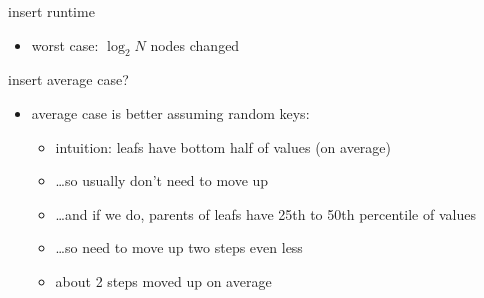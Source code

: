 \begin{frame}{insert runtime}
    \begin{itemize}
    \item worst case: $\log_2 N$ nodes changed
    \end{itemize}
\end{frame}

\begin{frame}{insert average case?}
    \begin{itemize}
    \item average case is better assuming random keys:
        \begin{itemize}
        \item intuition: leafs have bottom half of values (on average)
        \item \ldots so usually don't need to move up
        \item \ldots and if we do, parents of leafs have 25th to 50th percentile of values
        \item \ldots so need to move up two steps even less
        \item about 2 steps moved up on average
        \end{itemize}
    \end{itemize}
\end{frame}
